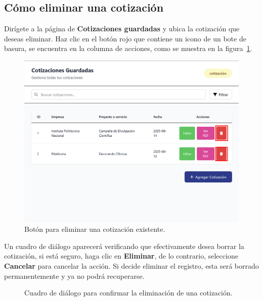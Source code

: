 \documentclass{Pretexto/bluereport}
\begin{document}
\begin{minipage}
\subsection{Cómo eliminar una cotización}
Dirígete a la página de \textbf{Cotizaciones guardadas} y ubica la cotización que deseas eliminar. Haz clic en el botón rojo que contiene un icono de un bote de basura,
 se encuentra en la columna de acciones, como se muestra en la figura~\ref{fig:eliminar_cotizacion}. 
\begin{figure}[H]
    \centering
        \includegraphics[width=0.8\linewidth]{img/eliminar_cotizacion.png} 
    \caption{Botón para eliminar una cotización existente.}
    \label{fig:eliminar_cotizacion}
\end{figure}
 Un cuadro de diálogo aparecerá verificando que efectivamente desea borrar la cotización, si está seguro, haga clic en \textbf{Eliminar}, de lo contrario, 
 seleccione \textbf{Cancelar} para cancelar la acción. Si decide eliminar el registro, esta será borrado permanentemente y ya no podrá recuperarse.
\begin{figure}[H]
    \centering
    \caption{Cuadro de diálogo para confirmar la eliminación de una cotización.}
    \label{fig:cuadro_eliminar}
\end{figure}

\end{minipage}
\end{document}
